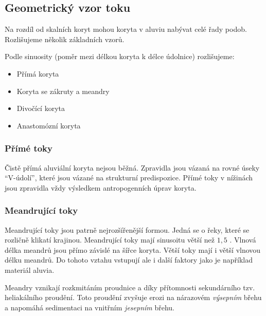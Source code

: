 \subsection{Geometrický vzor toku}
Na rozdíl od skalních koryt mohou koryta v aluviu nabývat celé řady podob. Rozlišujeme několik základních vzorů. 

Podle sinuosity (poměr mezi délkou koryta k délce údolnice) rozlišujeme:

\begin{itemize}
	\item Přímá koryta
	\item Koryta se zákruty a meandry
	\item Divočící koryta
	\item Anastomózní koryta
\end{itemize}

\subsubsection{Přímé toky}
Čistě přímá aluviální koryta nejsou běžná. Zpravidla jsou vázaná na rovné úseky \enquote{V-údolí}, které jsou vázané na strukturní predispozice. Přímé toky v nížinách jsou zpravidla vždy výsledkem antropogenních úprav koryta. 

\subsubsection{Meandrující toky}
Meandrující toky jsou patrně nejrozšířenější formou. Jedná se o řeky, které se rozličně klikatí krajinou. Meandrující toky mají sinusoitu větší než $1,5$ \parencite{huggettFundamentalsGeomorphology2017}. Vlnová délka meandrů jsou přímo závislé na šířce koryta. Větší toky mají i větší vlnovou délku meandrů. Do tohoto vztahu vstupují ale i další faktory jako je například materiál aluvia. 

Meandry vznikají rozkmitáním proudnice a díky přítomnosti sekundárního tzv. heliakálního proudění. Toto proudění zvyšuje erozi na nárazovém \emph{výsepním} břehu a napomáhá sedimentaci na vnitřním \emph{jesepním} břehu. 

